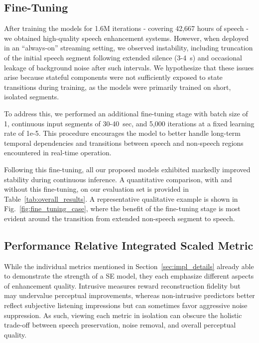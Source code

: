 \documentclass[final,5p,times,authoryear]{elsarticle}
\begin{document}
\subsection{Fine-Tuning}
\label{sec:fine_tuning}
After training the models for 1.6M iterations - covering 42,667 hours of speech - we obtained high-quality speech enhancement systems. However, when deployed in an ``always-on'' streaming setting, we observed instability, including truncation of the initial speech segment following extended silence (3-4~s) and occasional leakage of background noise after such intervals. We hypothesize that these issues arise because stateful components were not sufficiently exposed to state transitions during training, as the models were primarily trained on short, isolated segments.

To address this, we performed an additional fine-tuning stage with batch size of 1, continuous input segments of 30-40~sec, and 5,000 iterations at a fixed learning rate of 1e-5. This procedure encourages the model to better handle long-term temporal dependencies and transitions between speech and non-speech regions encountered in real-time operation.

Following this fine-tuning, all our proposed models exhibited markedly improved stability during continuous inference. A quantitative comparison, with and without this fine-tuning, on our evaluation set is provided in Table~\ref{tab:overall_results}. A representative qualitative example is shown in Fig.~\ref{fig:fine_tuning_case}, where the benefit of the fine-tuning stage is most evident around the transition from extended non-speech segment to speech.

\subsection{Performance Relative Integrated Scaled Metric}
\label{sec:prism}

While the individual metrics mentioned in Section~\ref{sec:impl_details} already able to demonstrate the strength of a SE model, they each emphasize different aspects of enhancement quality. Intrusive measures reward reconstruction fidelity but may undervalue perceptual improvements, whereas non-intrusive predictors better reflect subjective listening impressions but can sometimes favor aggressive noise suppression. As such, viewing each metric in isolation can obscure the holistic trade-off between speech preservation, noise removal, and overall perceptual quality.
\end{document}
